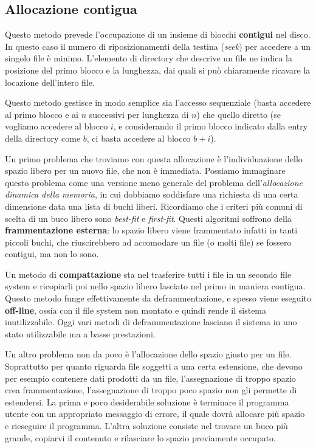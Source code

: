     \subsection{Allocazione contigua}
        Questo metodo prevede l'occupazione di un insieme di blocchi \textbf{contigui} nel disco. In questo caso il numero di riposizionamenti della testina (\textit{seek}) per accedere a un singolo file è minimo. L'elemento di directory che descrive un file ne indica la posizione del primo blocco e la lunghezza, dai quali si può chiaramente ricavare la locazione dell'intero file.
        
        Questo metodo gestisce in modo semplice sia l'accesso sequenziale (basta accedere al primo blocco e ai $n$ successivi per lunghezza di $n$) che quello diretto (se vogliamo accedere al blocco $i$, e considerando il primo blocco indicato dalla entry della directory come $b$, ci basta accedere al blocco $b+i$).
        
        Un primo problema che troviamo con questa allocazione è l'individuazione dello spazio libero per un nuovo file, che non è immediata. Possiamo immaginare questo problema come una versione meno generale del problema dell'\textit{allocazione dinamica della memoria}, in cui dobbiamo soddisfare una richiesta di una certa dimensione data una lista di buchi liberi. Ricordiamo che i criteri più comuni di scelta di un buco libero sono \textit{best-fit} e \textit{first-fit}. Questi algoritmi soffrono della \textbf{frammentazione esterna}: lo spazio libero viene frammentato infatti in tanti piccoli buchi, che riuscirebbero ad accomodare un file (o molti file) se fossero contigui, ma non lo sono.
        
        Un metodo di \textbf{compattazione} sta nel trasferire tutti i file in un secondo file system e ricopiarli poi nello spazio libero lasciato nel primo in maniera contigua. Questo metodo funge effettivamente da deframmentazione, e spesso viene eseguito \textbf{off-line}, ossia con il file system non montato e quindi rende il sistema inutilizzabile. Oggi vari metodi di deframmentazione lasciano il sistema in uno stato utilizzabile ma a basse prestazioni.
        
        Un altro problema non da poco è l'allocazione dello spazio giusto per un file. Soprattutto per quanto riguarda file soggetti a una certa estensione, che devono per esempio contenere dati prodotti da un file, l'assegnazione di troppo spazio crea frammentazione, l'assegnazione di troppo poco spazio non gli permette di estendersi. La prima e poco desiderabile soluzione è terminare il programma utente con un appropriato messaggio di errore, il quale dovrà allocare più spazio e rieseguire il programma. L'altra soluzione consiste nel trovare un buco più grande, copiarvi il contenuto e rilasciare lo spazio previamente occupato.
        
